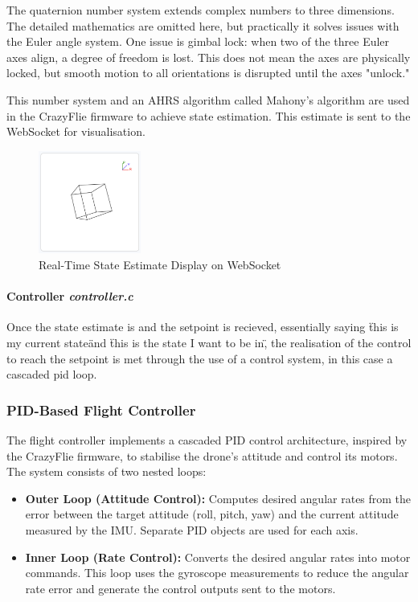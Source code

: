 The quaternion number system extends complex numbers to three dimensions. The detailed mathematics are omitted here, but practically it solves issues with the Euler angle system. One issue is gimbal lock: when two of the three Euler axes align, a degree of freedom is lost. This does not mean the axes are physically locked, but smooth motion to all orientations is disrupted until the axes "unlock."

This number system and an AHRS algorithm called Mahony's algorithm are used in the CrazyFlie firmware to achieve state estimation. This estimate is sent to the WebSocket for visualisation.

\begin{figure}[H]
    \centering
    \captionsetup{justification=centering, margin=1cm}
    \includegraphics[width=0.3\textwidth]{img/websocket-state.PNG}
    \caption{Real-Time State Estimate Display on WebSocket}
    \label{fig:ws-state}
\end{figure}

\paragraph{\textbf{Controller} \textit{controller.c}} \leavevmode 

Once the state estimate is and the setpoint is recieved, essentially saying \"this is my current state\" and \"this is the state I want to be in\", the realisation of the control to reach the setpoint is met through the use of a control system, in this case a cascaded \gls{pid} loop.

\subsubsection{PID-Based Flight Controller}

The flight controller implements a cascaded PID control architecture, inspired by the CrazyFlie firmware, to stabilise the drone's attitude and control its motors. The system consists of two nested loops:

\begin{itemize}
    \item \textbf{Outer Loop (Attitude Control):} Computes desired angular rates from the error between the target attitude (roll, pitch, yaw) and the current attitude measured by the IMU. Separate PID objects are used for each axis.
    \item \textbf{Inner Loop (Rate Control):} Converts the desired angular rates into motor commands. This loop uses the gyroscope measurements to reduce the angular rate error and generate the control outputs sent to the motors.
\end{itemize}

